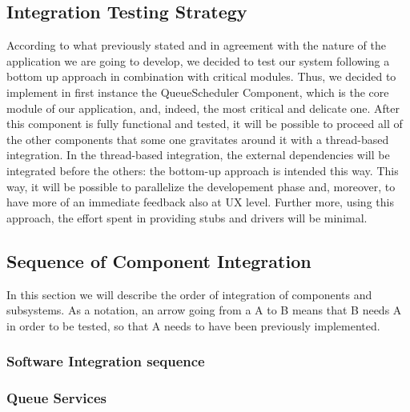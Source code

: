  \subsection{Integration Testing Strategy}
\label{subsect:integrationtestingstrategy}
According to what previously stated and in agreement with the nature of the application we are going to develop, we decided to test our system following a bottom up approach in combination with critical modules.\newline
Thus, we decided to implement in first instance the QueueScheduler Component, which is the core module of our application, and, indeed, the most critical and delicate one. After this component is fully functional and tested, it will be possible to proceed all of the other components that some one gravitates around it with a thread-based integration. In the thread-based integration, the external dependencies will be integrated before the others: the bottom-up approach is intended this way.\newline
This way, it will be possible to parallelize the developement phase and, moreover, to have more of an immediate feedback also at UX level. Further more, using this approach, the effort spent in providing stubs and drivers will be minimal.

\subsection{Sequence of Component Integration}
\label{subsect:integrationtestingstrategy}
In this section we will describe the order of integration of components and subsystems.
As a notation, an arrow going from a A to B means that B needs A in order to be tested, so that A needs to have been previously implemented.

\subsubsection{Software Integration sequence}
\label{subsect: softwareintegrationsequence}

\subsubsection*{Queue Services}

